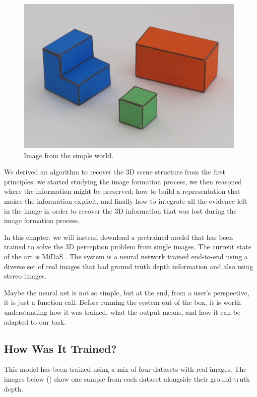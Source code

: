 \begin{figure}
\centerline{
\includegraphics[width=0.4\linewidth]{figures/simplesystem_revisited/img1.jpg}
} 
\caption{Image from the simple world.}
\label{fig:simplesystem_revisited_img1}
\end{figure}

We derived an algorithm to recover the 3D scene structure from the first principles: we started studying the image formation process, we then reasoned where the information might be preserved, how to build a representation that makes the information explicit, and finally how to integrate all the evidence left in the image in order to recover the 3D information that was lost during the image formation process.

In this chapter, we will instead download a pretrained model that has been trained to solve the 3D perception problem from single images. The current state of the art is MiDaS \cite{Ranftl2021,Ranftl2022}. The system is a neural network trained end-to-end using a diverse set of real images that had ground truth depth information and also using stereo images. 

Maybe the neural net is not so simple, but at the end, from a user's perspective, it is just a function call. Before running the system out of the box, it is worth understanding how it was trained, what the output means,  and how it can be adapted to our task. 

\subsection{How Was It Trained?}

This model has been trained using a mix of four datasets with real images. The images below (\fig{\ref{fig:examples_training_midas}}) show one sample from each dataset alongside their ground-truth depth.  

